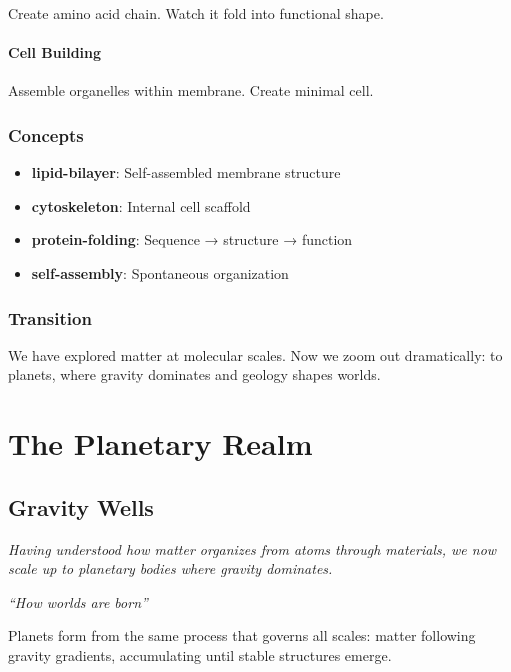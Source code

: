 \documentclass[
  11pt,
  letterpaper,
  twoside,
  openright]{book}
\providecommand{\tightlist}{%
  \setlength{\itemsep}{0pt}\setlength{\parskip}{0pt}}
\begin{document}
Create amino acid chain. Watch it fold into functional shape.

\subsection{Cell Building}\label{cell-building}

Assemble organelles within membrane. Create minimal cell.

\section{Concepts}\label{concepts-14}

\begin{itemize}
\tightlist
\item
  \textbf{lipid-bilayer}: Self-assembled membrane structure
\item
  \textbf{cytoskeleton}: Internal cell scaffold
\item
  \textbf{protein-folding}: Sequence → structure → function
\item
  \textbf{self-assembly}: Spontaneous organization
\end{itemize}

\section{Transition}\label{transition-14}

We have explored matter at molecular scales. Now we zoom out
dramatically: to planets, where gravity dominates and geology shapes
worlds.

\part{The Planetary Realm}

\chapter{Gravity Wells}\label{sec-gravity-wells}

\emph{Having understood how matter organizes from atoms through
materials, we now scale up to planetary bodies where gravity dominates.}

\emph{``How worlds are born''}

\begin{tcolorbox}[enhanced jigsaw, leftrule=.75mm, title=\textcolor{quarto-callout-note-color}{\faInfo}\hspace{0.5em}{Key Revelation}, bottomrule=.15mm, opacityback=0, coltitle=black, arc=.35mm, colframe=quarto-callout-note-color-frame, colbacktitle=quarto-callout-note-color!10!white, colback=white, titlerule=0mm, breakable, bottomtitle=1mm, toptitle=1mm, rightrule=.15mm, toprule=.15mm, left=2mm, opacitybacktitle=0.6]

Planets form from the same process that governs all scales: matter
following gravity gradients, accumulating until stable structures
emerge.

\end{tcolorbox}
\end{document}
